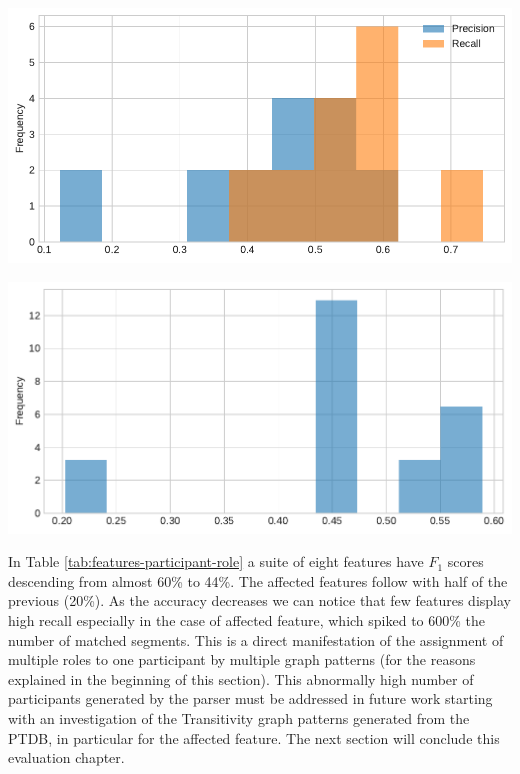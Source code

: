     \vspace{1em}
    \noindent
    \begin{minipage}[b]{0.49\textwidth}
        \centering
        \includegraphics[width=\textwidth]{evaluation-results/figures/PARTICIPANT-ROLE-distribution-PR-10.pdf}
        \label{fig:participant-role-precission-recall}
    \end{minipage}
    \quad
    \begin{minipage}[b]{0.49\textwidth}
        \centering
        \includegraphics[width=\textwidth]{evaluation-results/figures/PARTICIPANT-ROLE-distribution-F1-10.pdf}
        \label{fig:participant-role-precission-f1}
    \end{minipage}
    \vspace{1em}
    
    In Table \ref{tab:features-participant-role} a suite of eight features have $F_1$ scores descending from almost 60\% to 44\%. The affected features follow with half of the previous (20\%). As the accuracy decreases we can notice that few features display high recall especially in the case of affected feature, which spiked to 600\% the number of matched segments. This is a direct manifestation of the assignment of multiple roles to one participant by multiple graph patterns (for the reasons explained in the beginning of this section). This abnormally high number of participants generated by the parser must be addressed in future work starting with an investigation of the Transitivity graph patterns generated from the PTDB, in particular for the  affected feature. The next section will conclude this evaluation chapter.

